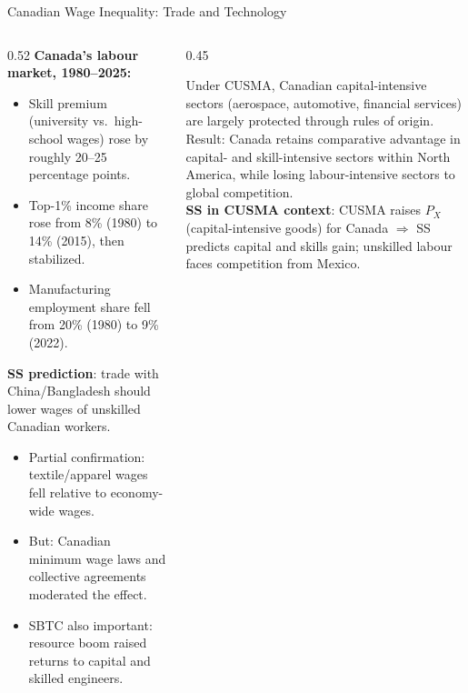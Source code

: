 \documentclass[aspectratio=169]{beamer}
\begin{document}
\begin{frame}[shrink=5]{Canadian Wage Inequality: Trade and Technology}
\begin{columns}[T]
\begin{column}{0.52\textwidth}
\textbf{Canada's labour market, 1980--2025:}
\begin{itemize}\small
  \item Skill premium (university vs.\ high-school
        wages) rose by roughly 20--25 percentage
        points.
  \item Top-1\% income share rose from 8\% (1980)
        to 14\% (2015), then stabilized.
  \item Manufacturing employment share fell from
        20\% (1980) to 9\% (2022).
\end{itemize}
\vspace{0.2em}
\textbf{SS prediction}: trade with China/Bangladesh
should lower wages of unskilled Canadian workers.
\begin{itemize}\small
  \item Partial confirmation: textile/apparel wages
        fell relative to economy-wide wages.
  \item But: Canadian minimum wage laws and collective
        agreements moderated the effect.
  \item SBTC also important: resource boom raised
        returns to capital and skilled engineers.
\end{itemize}
\end{column}
\begin{column}{0.45\textwidth}
\begin{canadex}
\small Under CUSMA, Canadian capital-intensive sectors
(aerospace, automotive, financial services) are
largely protected through rules of origin.\\[0.3em]
Result: Canada retains comparative advantage in
capital- and skill-intensive sectors within North
America, while losing labour-intensive sectors to
global competition.\\[0.3em]
\textbf{SS in CUSMA context}: CUSMA raises
$P_X$ (capital-intensive goods) for Canada
$\Rightarrow$ SS predicts capital and skills gain;
unskilled labour faces competition from Mexico.
\end{canadex}
\end{column}
\end{columns}
\end{frame}
\end{document}
